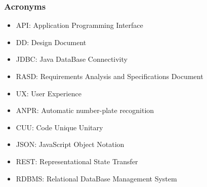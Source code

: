 \subsubsection{Acronyms}
\begin{itemize}
	\item
	API: Application Programming Interface
	\item
	DD: Design Document
	\item
	JDBC: Java DataBase Connectivity
	\item
	RASD: Requirements Analysis and Specifications Document
	\item
	UX: User Experience
	\item
	ANPR: Automatic number-plate recognition
	\item
	CUU: Code Unique Unitary
	\item 
	JSON: JavaScript Object Notation
	\item
	REST: Representational State Transfer
	\item 
	RDBMS: Relational DataBase Management System
\end{itemize}

